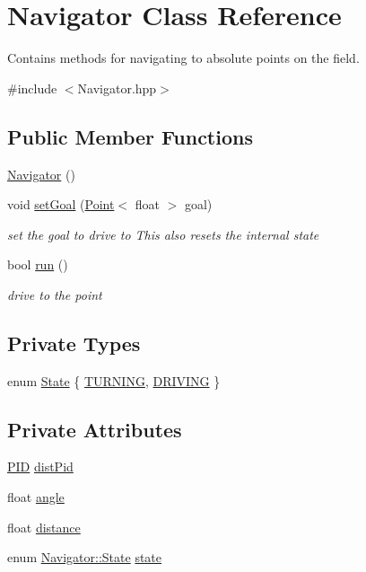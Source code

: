 \hypertarget{classNavigator}{\section{Navigator Class Reference}
\label{classNavigator}
}


Contains methods for navigating to absolute points on the field.  




{\ttfamily \#include $<$Navigator.\-hpp$>$}

\subsection*{Public Member Functions}
\begin{DoxyCompactItemize}
\item 
\hyperlink{classNavigator_a59230ab4698882f754d5ce275a1a4030}{Navigator} ()
\item 
void \hyperlink{classNavigator_a14da808a74fdc15ae4e0781060884ef8}{set\-Goal} (\hyperlink{classPoint}{Point}$<$ float $>$ goal)
\begin{DoxyCompactList}\small\item\em set the goal to drive to This also resets the internal state \end{DoxyCompactList}\item 
bool \hyperlink{classNavigator_a8841b985afa17a86112b8522ee6913e6}{run} ()
\begin{DoxyCompactList}\small\item\em drive to the point \end{DoxyCompactList}\end{DoxyCompactItemize}
\subsection*{Private Types}
\begin{DoxyCompactItemize}
\item 
enum \hyperlink{classNavigator_aae36be38543e3fae30dc53208e2f9913}{State} \{ \hyperlink{classNavigator_aae36be38543e3fae30dc53208e2f9913a80d7d232a04edaac4c8055a05242790b}{T\-U\-R\-N\-I\-N\-G}, 
\hyperlink{classNavigator_aae36be38543e3fae30dc53208e2f9913a9f34e19722c2c3385c6fe61d8de249e7}{D\-R\-I\-V\-I\-N\-G}
 \}
\end{DoxyCompactItemize}
\subsection*{Private Attributes}
\begin{DoxyCompactItemize}
\item 
\hyperlink{classPID}{P\-I\-D} \hyperlink{classNavigator_ab6f4e8b5937d700d4514c438cb7b3927}{dist\-Pid}
\item 
float \hyperlink{classNavigator_a20335cc0cf85bdd18af14ee2dfbd1501}{angle}
\item 
float \hyperlink{classNavigator_accc10be1bc4dfe67ce799e69869f0caa}{distance}
\item 
enum \hyperlink{classNavigator_aae36be38543e3fae30dc53208e2f9913}{Navigator\-::\-State} \hyperlink{classNavigator_a15263fe64d0ea29a1bbfe9e5ef849c4c}{state}
\end{DoxyCompactItemize}


